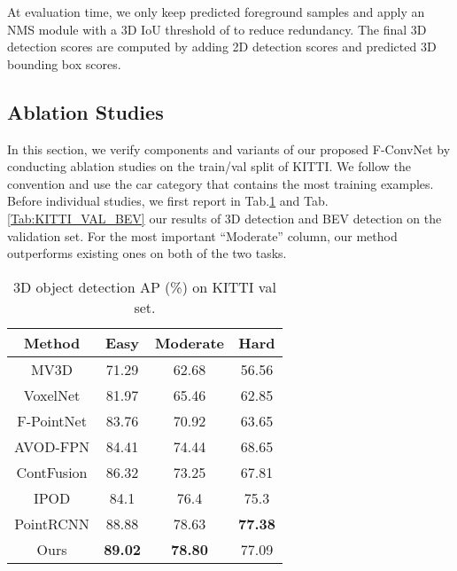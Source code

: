 \documentclass[letterpaper, 10 pt, conference]{ieeeconf}
\begin{document}
At evaluation time, we only keep predicted foreground samples and apply an NMS module with a 3D IoU threshold of  to reduce redundancy.
The final 3D detection scores are computed by adding 2D detection scores and predicted 3D bounding box scores.

\subsection{Ablation Studies}

In this section, we verify components and variants of our proposed F-ConvNet by conducting ablation studies on the train/val split of KITTI. We follow the convention and use the car category that contains the most training examples. Before individual studies, we first report in Tab.\ref{Tab:KITTI_VAL_3D} and Tab.\ref{Tab:KITTI_VAL_BEV} our results of 3D detection and BEV detection on the validation set.
For the most important ``Moderate'' column, our method outperforms existing ones on both of the two tasks.
\begin{table}
	\begin{center}
		\begin{tabular}{c|ccc}
			\hline
			Method                            & Easy           & Moderate       & Hard           \\ \hline
			MV3D\cite{chen2017multi}          & 71.29          & 62.68          & 56.56          \\
			VoxelNet\cite{zhou2018voxelnet}   & 81.97          & 65.46          & 62.85          \\
			F-PointNet\cite{qi2018frustum}    & 83.76          & 70.92          & 63.65          \\
			AVOD-FPN\cite{ku2018joint}        & 84.41          & 74.44          & 68.65          \\
			ContFusion\cite{liang2018deep}    & 86.32          & 73.25          & 67.81          \\
			IPOD \cite{yang2018ipod}          & 84.1           & 76.4           & 75.3           \\
			PointRCNN \cite{shi2018pointrcnn} & 88.88          & 78.63          & \textbf{77.38} \\ \hline
			Ours                              & \textbf{89.02} & \textbf{78.80} & 77.09          \\ \hline
		\end{tabular}
		\caption{3D object detection AP (\%) on KITTI val set.}
		\label{Tab:KITTI_VAL_3D}
	\end{center}
	\vspace{-0.5cm}
\end{table}
\end{document}
